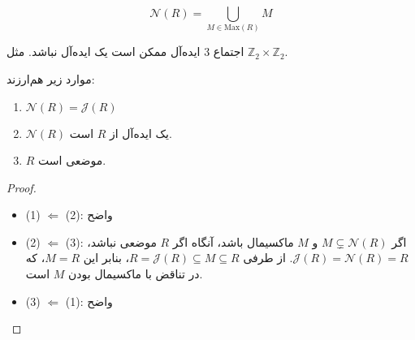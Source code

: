\begin{definition}
    \[
        \mathcal{N}(R) = \bigcup_{M \in \mathrm{Max}(R)} M
    \]
\end{definition}


\begin{remark}
    اجتماع 3 ایده‌آل ممکن است یک ایده‌آل نباشد. مثل \( \mathbb{Z}_2 \times \mathbb{Z}_2 \).
\end{remark}


\begin{theorem}
    موارد زیر هم‌ارزند:
    \begin{enumerate}
        \item \(\mathcal{N}(R) = \mathcal{J}(R)\)
        \item \(\mathcal{N}(R)\) یک ایده‌آل از \(R\) است.
        \item \(R\) موضعی است.
    \end{enumerate}
\end{theorem}

\begin{proof}
    \begin{itemize}
        \item (1) $\Leftarrow$ (2): \checkmark واضح
        \item (2) $\Leftarrow$ (3): اگر \( M \subsetneq \mathcal{N}(R) \) و \( M \) ماکسیمال باشد، آنگاه اگر \( R \) موضعی نباشد،
              \( \mathcal{J}(R) = \mathcal{N}(R) = R\).
              از طرفی
              \(R = \mathcal{J}(R) \subseteq M \subseteq R\)،
              بنابر این
              \(M = R\)،
              که در تناقض با ماکسیمال بودن
              \(M\)
              است.
        \item (3) $\Leftarrow$ (1): \checkmark واضح
    \end{itemize}
\end{proof}
